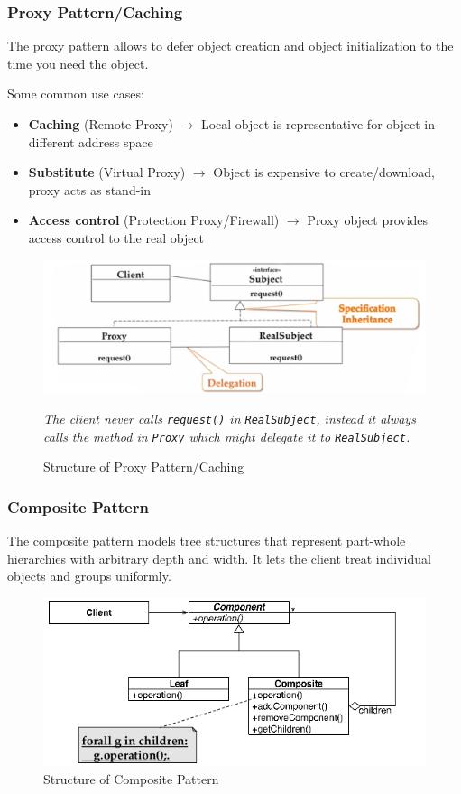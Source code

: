 \subsubsection{Proxy Pattern/Caching}
The proxy pattern allows to defer object creation and object initialization to the time you need the object.

Some common use cases:
\begin{itemize}
	\item \textbf{Caching} (Remote Proxy)
		\subitem $\rightarrow$ Local object is representative for object in different address space
	\item \textbf{Substitute} (Virtual Proxy)
		\subitem $\rightarrow$ Object is expensive to create/download, proxy acts as stand-in
	\item \textbf{Access control} (Protection Proxy/Firewall)
		\subitem $\rightarrow$ Proxy object provides access control to the real object
\end{itemize}
\begin{figure}[h]
	\centering
	\includegraphics[width=\linewidth]{images/pattern_proxy.png}
	\caption{Structure of Proxy Pattern/Caching}{\textit{The client never calls \texttt{request()} in \texttt{RealSubject}, instead it always calls the method in \texttt{Proxy} which might delegate it to \texttt{RealSubject}.}}
\end{figure}
\newpage

\subsubsection{Composite Pattern}
The composite pattern models tree structures that represent part-whole hierarchies with arbitrary depth and width.
It lets the client treat individual objects and groups uniformly.
\begin{figure}[h]
	\centering
	\includegraphics[width=\linewidth]{images/pattern_composite.png}
	\caption{Structure of Composite Pattern}
\end{figure}
\newpage


